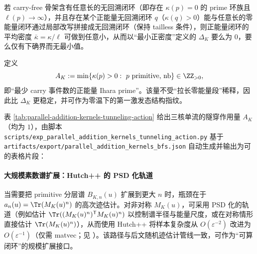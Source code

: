\begin{proposition}[密度能隙的退化机制与隧穿作用量]\label{prop:ihara-gap-degeneracy}
若 carry-free 骨架含有任意长的无回溯闭环（即存在 \(\kappa(p)=0\) 的 prime 环族且 \(\ell(p)\to\infty\)），并且存在某个正能量无回溯闭环 \(q\)（\(\kappa(q)>0\)）能与任意长的零能量闭环通过局部改写拼接成无回溯闭环（保持 tailless 条件），则正能量闭环的平均密度 \(\bar\kappa=\kappa/\ell\) 可做到任意小，从而以“最小正密度”定义的 \(\Delta_K\) 要么为 \(0\)，要么仅有下确界而无最小值。
\end{proposition}

\begin{definition}\label{def:ihara-tunneling-action}
定义
$$
A_K:=\min\{\kappa(p)>0:\ p\ \text{primitive, nb}\}\in\ZZ_{>0},
$$
即“最少 carry 事件数的正能量 Ihara prime”。该量不受“拉长零能量段”稀释，因此比 \(\Delta_K\) 更稳定，并可作为零温下的第一激发态结构指纹。
\end{definition}

\begin{remark}\label{rem:ihara-AK-table}
表 \ref{tab:parallel-addition-kernels-tunneling-action} 给出三核单流的隧穿作用量 \(A_K\)（均为 \(1\)），由脚本
\texttt{scripts/exp\_parallel\_addition\_kernels\_tunneling\_action.py}
基于 \texttt{artifacts/export/parallel\_addition\_kernels\_bfs.json} 自动生成并输出为可 \verb|| 的表格片段：

\end{remark}

\paragraph{大规模素数谱扩展：Hutch++ 的 PSD 化轨道}
当需要把 primitive 分层谱 $B_{K,n}(u)$ 扩展到更大 $n$ 时，瓶颈在于 $a_n(u)=\Tr(M_K(u)^n)$ 的高次迹估计。对非对称 $M_K(u)$，可采用 PSD 化的轨道（例如估计 $\Tr((M_K(u)^n)^{\mathsf T}M_K(u)^n)$ 以控制谱半径与能量尺度，或在对称情形直接估计 $\Tr(M_K(u)^n)$），从而使用 Hutch++ 将样本复杂度从 $O(\varepsilon^{-2})$ 改进为 $O(\varepsilon^{-1})$（仅需 matvec；见 \cite{MeyerMuscoMuscoWoodruff2021Hutchpp}）。该路径与后文随机迹估计管线一致，可作为“可算闭环”的规模扩展接口。

